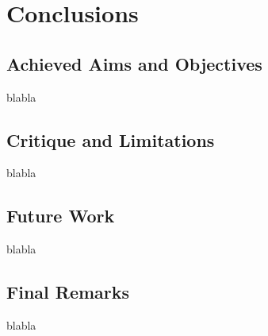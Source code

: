 \chapter{Conclusions}

\section{Achieved Aims and Objectives}
blabla

\section{Critique and Limitations}
blabla

\section{Future Work}
blabla

\section{Final Remarks}
blabla